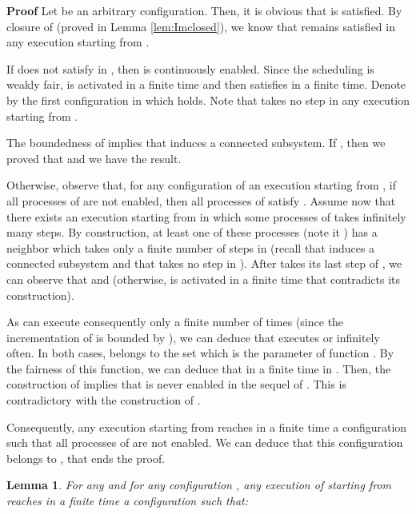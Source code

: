 \documentclass[11pt]{article}
\newenvironment{proof}{\noindent\textbf{Proof}}{\hfill\qed}
\newcommand{\qed}{\hfill}
\newtheorem{lem}{Lemma}
\newenvironment{lemma}[1]{\vspace{-0.25cm}\begin{lem}#1}{\end{lem}\vspace{-0.3cm}}
\begin{document}
\begin{proof}
Let  be an arbitrary configuration. Then, it is obvious that  is satisfied. By closure of  (proved in Lemma \ref{lem:Imclosed}), we know that  remains satisfied in any execution starting from .

If  does not satisfy  in , then  is continuously enabled. Since the scheduling is weakly fair,  is activated in a finite time and then  satisfies  in a finite time. Denote by  the first configuration in which  holds. Note that  takes no step in any execution starting from .

The boundedness of  implies that  induces a connected subsystem. If , then we proved that  and we have the result.

Otherwise, observe that, for any configuration of an execution starting from , if all processes of  are not enabled, then all processes  of  satisfy . Assume now that there exists an execution  starting from  in which some processes of  takes infinitely many steps. By construction, at least one of these processes (note it ) has a neighbor  which takes only a finite number of steps in  (recall that  induces a connected subsystem and that  takes no step in ). After  takes its last step of , we can observe that  and  (otherwise,  is activated in a finite time that contradicts its construction). 

As  can execute consequently  only a finite number of times (since the incrementation of  is bounded by ), we can deduce that  executes  or  infinitely often. In both cases,  belongs to the set which is the parameter of function . By the fairness of this function, we can deduce that  in a finite time in . Then, the construction of  implies that  is never enabled in the sequel of . This is contradictory with the construction of .

Consequently, any execution starting from  reaches in a finite time a configuration such that all processes of  are not enabled. We can deduce that this configuration belongs to , that ends the proof.
\end{proof}

\begin{lemma}\label{lem:LCmitodistD}
For any  and for any configuration , any execution of  starting from  reaches in a finite time a configuration such that:

\end{lemma}
\end{document}
